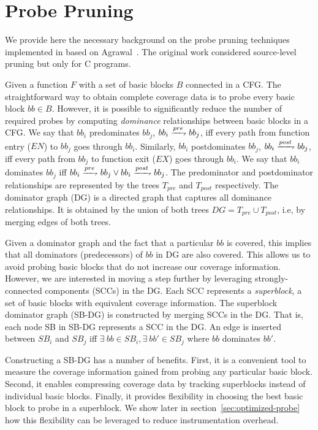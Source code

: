 {\section{Probe Pruning}
\label{sec:probe-pruning}

We provide here the necessary background on the probe pruning techniques implemented in {\bcov} based on Agrawal~\cite{Agrawal1994}. 
The original work considered source-level pruning but only for C programs.

Given a function $F$ with a set of basic blocks $B$ connected in a CFG. 
The straightforward way to obtain complete coverage data is to probe every basic block $bb \in B$. 
However, it is possible to significantly reduce the number of required probes by computing \textit{dominance} relationships between basic blocks in a CFG. 
We say that $bb_i$ predominates $bb_j$, $bb_i\xrightharpoondown{pre}bb_j $, iff every path from function entry ($EN$) to $bb_j$ goes through $bb_i$.
Similarly, $bb_i$ postdominates $bb_j$, $bb_i\xrightharpoondown{post}bb_j $, iff every path from $bb_j$ to function exit ($EX$) goes through $bb_i$. 
We say that $bb_i$ dominates $bb_j$ iff \mbox{$bb_i\xrightharpoondown{pre}bb_j \vee bb_i\xrightharpoondown{post}bb_j $}. 
The predominator and postdominator relationships are represented by the trees $T_{pre} $ and $T_{post} $ respectively. 
The dominator graph (DG) is a directed graph that captures all dominance relationships. 
It is obtained by the union of both trees  $DG = T_{pre} \cup T_{post} $, i.e,  by merging edges of both trees.


Given a dominator graph and the fact that a particular $bb$ is covered, this implies that all dominators (predecessors) of $bb$ in DG are also covered.
This allows us to avoid probing basic blocks that do not increase our coverage information.
However, we are interested in moving a step further by leveraging strongly-connected components (SCCs) in the DG.
Each SCC represents a \textit{superblock}, a set of basic blocks with equivalent coverage information.
The superblock dominator graph (SB-DG) is constructed by merging SCCs in the DG.
That is, each node SB in SB-DG represents a SCC in the DG. 
An edge is inserted between $SB_i$ and $SB_j$ iff  $\exists~bb \in SB_i, \exists~bb' \in SB_j$ where $bb$ dominates $bb'$.

Constructing a SB-DG has a number of benefits.
First, it is a convenient tool to measure the coverage information gained from probing any particular basic block.
Second, it enables compressing coverage data by tracking superblocks instead of individual basic blocks.
Finally, it provides flexibility in choosing the best basic block to probe in a superblock. 
We show later in section~\ref{sec:optimized-probe} how this flexibility can be leveraged to reduce instrumentation overhead.

}
